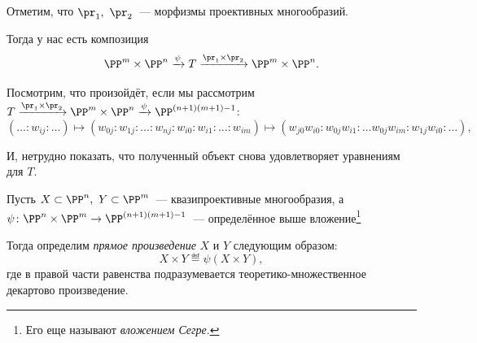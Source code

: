  	\begin{remark}
 		Отметим, что $\pr_1, \ \pr_2$~--- морфизмы проективных многообразий. 
 	\end{remark}

 	Тогда у нас есть композиция 
 	\[
 		\PP^m \times \PP^n \xrightarrow{\psi} T \xrightarrow{\pr_1 \times \pr_2} \PP^m \times \PP^n.
 	\]

 	Посмотрим, что произойдёт, если мы рассмотрим $T \xrightarrow{\pr_1 \times \pr_2} \PP^m \times \PP^n \xrightarrow{\psi} \PP^{(n +1)(m + 1) - 1}$:
 	\[
 		(\ldots : w_{i j} : \ldots) \mapsto (w_{0 j} : w_{1 j} : \ldots : w_{n j} : w_{i 0} : w_{i 1} : \ldots : w_{i m}) \mapsto (w_{j 0} w_{i 0} : w_{0 j} w_{i 1} : \ldots w_{0 j} w_{i m} : w_{1 j} w_{i 0} : \ldots ),
 	\]

 	И, нетрудно показать, что полученный объект снова удовлетворяет уравнениям для $T$. 

    \hypertarget{bilet_21}{}

 	\begin{definition} 
 		Пусть $X \subset \PP^n, \ Y \subset \PP^m$~--- квазипроективные многообразия, а $\psi \colon \PP^n \times \PP^m \to \PP^{(n + 1)(m + 1) - 1}$~--- определённое выше вложение\footnote{Его еще называют \emph{вложением Сегре}. }

 		Тогда определим \emph{прямое произведение} $X$ и $Y$ следующим образом: 
 		\[
 			X \times Y \eqdef \psi(X \times Y),
 		\]
 		где в правой части равенства подразумевается теоретико-множественное декартово произведение. 
 	\end{definition}

